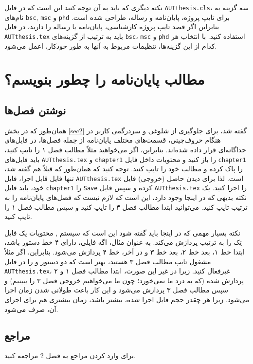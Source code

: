 نکته دیگری که باید به آن توجه کنید این است که در فایل 
\verb;AUTthesis.cls;،
سه گزینه به نام‌های
\verb;bsc;,
\verb;msc;
و
\verb;phd;
برای تایپ پروژه، پایان‌نامه و رساله،
طراحی شده است. بنابراین اگر قصد تایپ پروژه کارشناسی، پایان‌نامه یا رساله را دارید، 
 در فایل 
\verb;AUTthesis.tex;
باید به ترتیب از گزینه‌های
\verb;bsc;،
\verb;msc;
و
\verb;phd;
استفاده کنید. با انتخاب هر کدام از این گزینه‌ها، تنظیمات مربوط به آنها به طور خودکار، اعمل می‌شود.

\section{مطالب پایان‌نامه را چطور بنویسم؟}
\subsection{نوشتن فصل‌ها}
همان‌طور که در بخش 
\ref{sec2}
گفته شد، برای جلوگیری از شلوغی و سردرگمی کاربر در هنگام حروف‌چینی، قسمت‌های مختلف پایان‌نامه از جمله فصل‌ها، در فایل‌های جداگانه‌ای قرار داده شده‌اند. 
بنابراین، اگر می‌خواهید مثلاً مطالب فصل ۱ را تایپ کنید، باید فایل‌های 
\verb;AUTthesis.tex;
و
\verb;chapter1;
را باز کنید و محتویات داخل فایل 
\verb;chapter1;
را پاک کرده و مطالب خود را تایپ کنید. توجه کنید که همان‌طور که قبلاً هم گفته شد، تنها فایل قابل اجرا، فایل 
\verb;AUTthesis.tex;
است. لذا برای دیدن حاصل (خروجی) فایل خود، باید فایل  
\verb;chapter1;
را 
\verb;Save;
کرده و سپس فایل 
\verb;AUTthesis.tex;
را اجرا کنید. یک نکته بدیهی که در اینجا وجود دارد، این است که لازم نیست که فصل‌های پایان‌نامه را به ترتیب تایپ کنید. می‌توانید ابتدا مطالب فصل ۳ را تایپ کنید و سپس مطالب فصل ۱ را تایپ کنید.

نکته بسیار مهمی که در اینجا باید گفته شود این است که سیستم
\lr{\TeX},
محتویات یک فایل تِک را به ترتیب پردازش می‌کند. به عنوان مثال، اگه فایلی، دارای ۴ خط دستور باشد، ابتدا خط ۱، بعد خط ۲، بعد خط ۳ و در آخر، خط ۴ پردازش می‌شود. بنابراین، اگر مثلاً مشغول تایپ مطالب فصل ۳ هستید، بهتر است
که دو دستور
\verb~~
و
\verb~~
را در فایل 
\verb~AUTthesis.tex~،
غیرفعال%
 کنید. زیرا در غیر این صورت، ابتدا مطالب فصل ۱ و ۲ پردازش شده (که به درد ما نمی‌خورد؛ چون ما می‌خواهیم خروجی فصل ۳ را ببینیم) و سپس مطالب فصل ۳ پردازش می‌شود و این کار باعث طولانی شدن زمان اجرا می‌شود. زیرا هر چقدر حجم فایل اجرا شده، بیشتر باشد، زمان بیشتری هم برای اجرای آن، صرف می‌شود.

\subsection{مراجع}
برای وارد کردن مراجع به فصل 2
مراجعه کنید.
